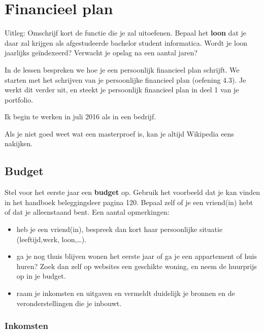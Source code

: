 \chapter{Financieel plan}
\label{financieelplan}

Uitleg: Omschrijf kort de functie die je zal uitoefenen. Bepaal het \textbf{loon} dat je daar zal krijgen als afgestudeerde bachelor student informatica. Wordt je loon
jaarlijks geïndexeerd? Verwacht je opslag na een aantal jaren?

In de lessen bespreken we hoe je een persoonlijk financieel plan schrijft. We starten met het
schrijven van je persoonlijke financieel plan (oefening 4.3). Je werkt dit verder uit, en steekt je
persoonlijk financieel plan in deel 1 van je portfolio.\newline\newline

Ik begin te werken in juli 2016 als \functiejob in een bedrijf.


Als je niet goed weet wat een masterproef is, kan je altijd Wikipedia\cite{Wikipedia} eens nakijken.


\newpage
\section{Budget}

Stel voor het eerste jaar een \textbf{budget} op. Gebruik het voorbeeld dat je kan vinden in het handboek beleggingsleer pagina 120. Bepaal zelf of je een vriend(in) hebt of dat je alleenstaand bent. Een aantal opmerkingen:
\begin{itemize}
	\item heb je een vriend(in), bespreek dan kort haar persoonlijke situatie (leeftijd,werk, loon,…).
	\item ga je nog thuis blijven wonen het eerste jaar of ga je een appartement of huis huren? Zoek dan zelf op websites een geschikte woning, en neem de
	huurprijs op in je budget.
	\item raam je inkomsten en uitgaven en vermeldt duidelijk je bronnen en de
	veronderstellingen die je inbouwt.
\end{itemize}

\subsection{Inkomsten}


